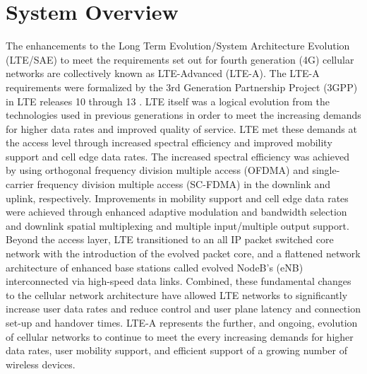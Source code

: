 \section{System Overview}
\label{sys-overview}
The enhancements to the Long Term Evolution/System Architecture Evolution (LTE/SAE) to meet the requirements set out for fourth generation (4G) cellular networks are collectively known as LTE-Advanced (LTE-A).  The LTE-A requirements were formalized by the 3rd Generation Partnership Project (3GPP) in LTE releases 10 through 13 \cite{tr36913}.  LTE itself was a logical evolution from the technologies used in previous generations in order to meet the increasing demands for higher data rates and improved quality of service. LTE met these demands at the access level through increased spectral efficiency and improved mobility support and cell edge data rates.  The increased spectral efficiency was achieved by using orthogonal frequency division multiple access (OFDMA) and single-carrier frequency division multiple access (SC-FDMA) in the downlink and uplink, respectively.  Improvements in mobility support and cell edge data rates were achieved through enhanced adaptive modulation and bandwidth selection and downlink spatial multiplexing and multiple input/multiple output support.  Beyond the access layer, LTE transitioned to an all IP packet switched core network with the introduction of the evolved packet core, and a flattened network architecture of enhanced base stations called evolved NodeB's (eNB) interconnected via high-speed data links.  Combined, these fundamental changes to the cellular network architecture have allowed LTE networks to significantly increase user data rates and reduce control and user plane latency and connection set-up and handover times.  LTE-A represents the further, and ongoing, evolution of cellular networks to continue to meet the every increasing demands for higher data rates, user mobility support, and efficient support of a growing number of wireless devices.

